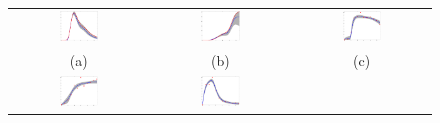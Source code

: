 \documentclass{article}
\begin{document}
 

\begin{figure}
\begin{center}
\begin{tabular}{ccc}
      \includegraphics[width=0.3\textwidth]{./toyMarch25MCMC19-Sep-2010logOnePlusExpgenHillTFproteins_Rep1TF1} &
      \includegraphics[width=0.3\textwidth]{./toyMarch25MCMC19-Sep-2010logOnePlusExpgenHillTFproteins_Rep1TF2} &      
      \includegraphics[width=0.3\textwidth]{./toyMarch25MCMC19-Sep-2010logOnePlusExpgenHillReplica1GENEmRNA17}\\ 
      (a) & (b) & (c) \\
      \includegraphics[width=0.3\textwidth]{./toyMarch25MCMC19-Sep-2010logOnePlusExpgenHillReplica1GENEmRNA5} &
      \includegraphics[width=0.3\textwidth]{./toyMarch25MCMC19-Sep-2010logOnePlusExpgenHillReplica1GENEmRNA16} &      

\end{tabular}
\end{center}
\end{figure}
\end{document}

